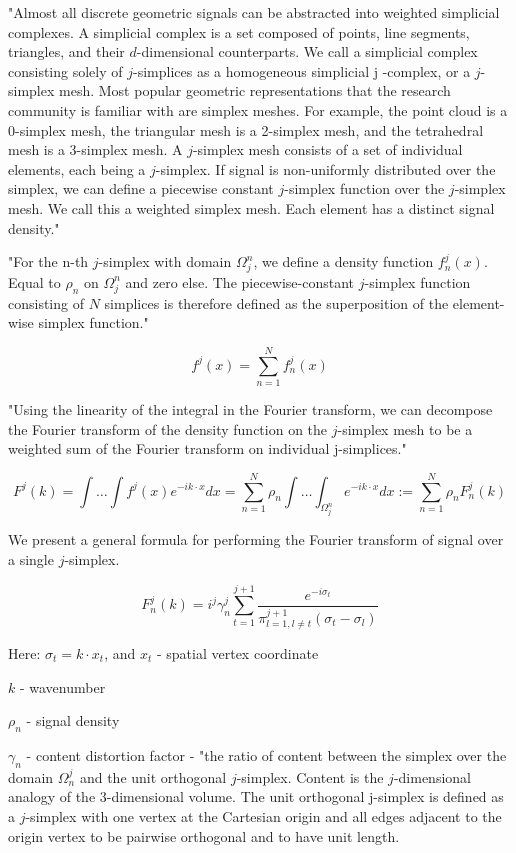 \documentclass[english]{article}
\begin{document}
"Almost all discrete geometric signals can be abstracted into weighted simplicial complexes. A
simplicial complex is a set composed of points, line segments, triangles, and their $d$-dimensional
counterparts. We call a simplicial complex consisting solely of $j$-simplices as a homogeneous
simplicial j -complex, or a $j$-simplex mesh. Most popular geometric representations that the research
community is familiar with are simplex meshes. For example, the point cloud is a 0-simplex mesh, the
triangular mesh is a 2-simplex mesh, and the tetrahedral mesh is a 3-simplex mesh. A $j$-simplex mesh
consists of a set of individual elements, each being a $j$-simplex. If signal is non-uniformly distributed
over the simplex, we can define a piecewise constant $j$-simplex function over the $j$-simplex mesh.
We call this a weighted simplex mesh. Each element has a distinct signal density."

"For the n-th $j$-simplex with domain $\Omega_j^n$, we define a density function $f
^j_n(x)$. Equal to $\rho_n$ on $\Omega_j^n$ and zero else. The piecewise-constant $j$-simplex function consisting of $N$ simplices is therefore defined as the superposition of the element-wise simplex function."

$$f^j(x) =
\sum^N_{n=1}f^j_n(x)
$$

"Using the linearity of the integral in the Fourier
transform, we can decompose the Fourier transform of the density function on the $j$-simplex mesh to be a weighted sum of the Fourier transform on individual j-simplices."

$$F^j(k) =
\int\ldots\int f^j(x)e^{-ik\cdot x}dx =
\sum^N_{n=1}\rho_n
\int\ldots\int_{\Omega_j^n}e^{-ik\cdot x}dx
:=
\sum^N_{n=1}\rho_n F^j_n(k)
$$

We present a general formula for performing the Fourier transform of signal over a single $j$-simplex.

$$F^j_n(k) =
i^j \gamma^j_n
\sum^{j+1}_{t=1}
\frac{e^{-i\sigma_t}}
{\pi^{j+1}_{l=1,l\neq t} (\sigma_t - \sigma_l)}
$$


Here:  $\sigma_t = k\cdot x_t$, and $x_t$ - spatial vertex coordinate

$k$ - wavenumber

$\rho_n$ - signal density

$\gamma_n$ - content distortion factor -  "the ratio of content between the simplex over the domain $\Omega^j_n$ and the unit orthogonal $j$-simplex. Content is the $j$-dimensional analogy of the
3-dimensional volume. The unit orthogonal j-simplex is defined as a $j$-simplex with one vertex at the
Cartesian origin and all edges adjacent to the origin vertex to be pairwise orthogonal and to have unit
length.
\end{document}
